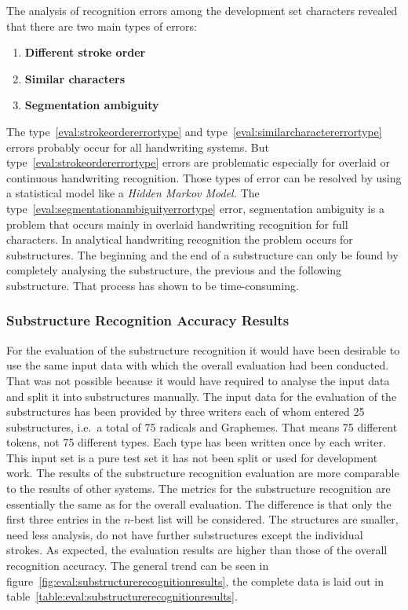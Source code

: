 The analysis of recognition errors among the development set characters 
revealed that there are two main types of errors: 
\begin{enumerate}
\item \textbf{Different stroke order}\label{eval:strokeordererrortype}
\item \textbf{Similar characters}    \label{eval:similarcharactererrortype}
\item \textbf{Segmentation ambiguity}\label{eval:segmentationambiguityerrortype}
\end{enumerate}
The type~\ref{eval:strokeordererrortype} and 
type~\ref{eval:similarcharactererrortype} errors probably occur for
all handwriting systems. But type~\ref{eval:strokeordererrortype} errors 
are problematic especially for overlaid or continuous handwriting recognition.
Those types of error can be resolved by using a statistical model like a 
\emph{Hidden Markov Model.}
The type~\ref{eval:segmentationambiguityerrortype} error, 
segmentation ambiguity is a problem that occurs mainly in overlaid 
handwriting recognition for full characters. 
In analytical handwriting recognition the problem occurs for substructures. 
The beginning and the end of a substructure can only be found by completely 
analysing the substructure, the previous and the following substructure. 
That process has shown to be time-consuming.

\subsubsection{Substructure Recognition Accuracy Results}
\label{sec:eval:resultssubstructurerecognition}
For the evaluation of the substructure recognition it would have been
desirable to use the same input data with which the overall evaluation
had been conducted. That was not possible because it would have required
to analyse the input data and split it into substructures manually.
The input data for the evaluation of the substructures has been provided by
three writers each of whom entered 25 substructures, i.e.\ a total of 75
radicals and Graphemes. That means 75 different tokens, not 75 different types.
Each type has been written once by each writer.
This input set is a pure test set it has not been split or used for
development work. The results of the substructure recognition evaluation
are more comparable to the results of other systems.
The metrics for the substructure recognition are essentially the same as for
the overall evaluation.
The difference is that only the first three entries in the \(n\)-best list
will be considered. The structures are smaller, need less analysis, do not
have further substructures except the individual strokes. 
As expected, the evaluation results are higher than those of the overall 
recognition accuracy. The general trend can be seen in 
figure~\ref{fig:eval:substructurerecognitionresults}, the complete data is
laid out in table~\ref{table:eval:substructurerecognitionresults}.

